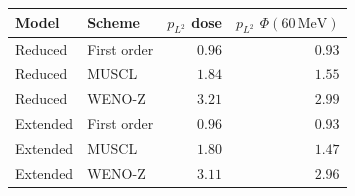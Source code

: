 \begin{tabular}{ll rr}
\toprule
Model & Scheme & $p_{L^2}$ dose & $p_{L^2}$ $\Phi(60\,\mathrm{MeV})$ \\
\midrule
Reduced & First order & $0.96$ & $0.93$ \\
Reduced & MUSCL & $1.84$ & $1.55$ \\
Reduced & WENO-Z & $3.21$ & $2.99$ \\
\addlinespace
Extended & First order & $0.96$ & $0.93$ \\
Extended & MUSCL & $1.80$ & $1.47$ \\
Extended & WENO-Z & $3.11$ & $2.96$ \\
\bottomrule
\end{tabular}

